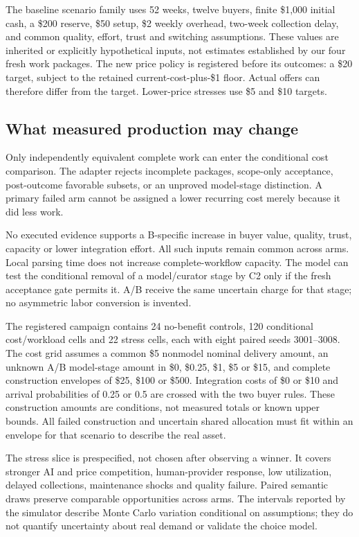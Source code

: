 \documentclass[11pt,a4paper]{article}
\begin{document}
The baseline scenario family uses 52 weeks, twelve buyers, finite \$1,000 initial cash, a \$200 reserve, \$50 setup, \$2 weekly overhead, two-week collection delay, and common quality, effort, trust and switching assumptions. These values are inherited or explicitly hypothetical inputs, not estimates established by our four fresh work packages. The new price policy is registered before its outcomes: a \$20 target, subject to the retained current-cost-plus-\$1 floor. Actual offers can therefore differ from the target. Lower-price stresses use \$5 and \$10 targets.

\subsection{What measured production may change}
Only independently equivalent complete work can enter the conditional cost comparison. The adapter rejects incomplete packages, scope-only acceptance, post-outcome favorable subsets, or an unproved model-stage distinction. A primary failed arm cannot be assigned a lower recurring cost merely because it did less work.

No executed evidence supports a B-specific increase in buyer value, quality, trust, capacity or lower integration effort. All such inputs remain common across arms. Local parsing time does not increase complete-workflow capacity. The model can test the conditional removal of a model/curator stage by C2 only if the fresh acceptance gate permits it. A/B receive the same uncertain charge for that stage; no asymmetric labor conversion is invented.

The registered campaign contains 24 no-benefit controls, 120 conditional cost/workload cells and 22 stress cells, each with eight paired seeds 3001--3008. The cost grid assumes a common \$5 nonmodel nominal delivery amount, an unknown A/B model-stage amount in \$0, \$0.25, \$1, \$5 or \$15, and complete construction envelopes of \$25, \$100 or \$500. Integration costs of \$0 or \$10 and arrival probabilities of 0.25 or 0.5 are crossed with the two buyer rules. These construction amounts are conditions, not measured totals or known upper bounds. All failed construction and uncertain shared allocation must fit within an envelope for that scenario to describe the real asset.

The stress slice is prespecified, not chosen after observing a winner. It covers stronger AI and price competition, human-provider response, low utilization, delayed collections, maintenance shocks and quality failure. Paired semantic draws preserve comparable opportunities across arms. The intervals reported by the simulator describe Monte Carlo variation conditional on assumptions; they do not quantify uncertainty about real demand or validate the choice model.
\end{document}
